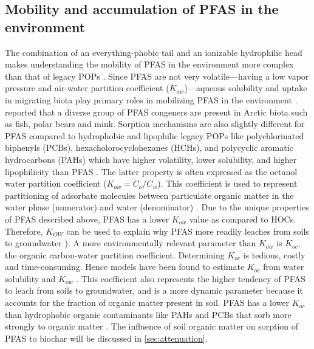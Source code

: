 \subsection{Mobility and accumulation of PFAS in the environment}
The combination of an everything-phobic tail and an ionizable hydrophilic head makes understanding the mobility of PFAS in the environment more complex than that of legacy POPs \citep{cabrerizo2018legacy,Arp2006}. Since PFAS are not very volatile---having a low vapor pressure and air-water partition coefficient ($K_{aw}$)---aqueous solubility and uptake in migrating biota play primary roles in mobilizing PFAS in the environment \citep{Arp2006}. \cite{Schlabach2017} reported that a diverse group of PFAS congeners are present in Arctic biota such as fish, polar bears and mink. Sorption mechanisms are also slightly different for PFAS compared to hydrophobic and lipophilic legacy POPs like polychlorinated biphenyls (PCBs), hexacholorocyclohexanes (HCHs), and polycyclic aromatic hydrocarbons (PAHs) which have higher volatility, lower solubility, and higher lipophilicity than PFAS \citep{cabrerizo2018legacy, Cornelissen2005,li2018}. The latter property is often expressed as the octanol water partition coefficient (\(K_{ow} = C_{o}/C_w\)). This coefficient is used to represent partitioning of adsorbate molecules between particulate organic matter in the water phase (numerator) and water (denominator) \citep{Reemtsma2016}. Due to the unique properties of PFAS described above, PFAS has a lower \(K_{ow}\) value as compared to HOCs. Therefore, \(K_{OW}\) can be used to explain why PFAS more readily leaches from soils to groundwater \citep{Cornelissen2005,du2014adsorption}). A more environmentally relevant parameter than \(K_{ow}\) is \(K_{oc}\), the organic carbon-water partition coefficient. Determining \(K_{oc}\) is tedious, costly and time-consuming. Hence models have been found to estimate \(K_{oc}\) from water solubility and \(K_{ow}\) \citep{pandey2021qspr}. This coefficient also represents the higher tendency of PFAS to leach from soils to groundwater, and is a more dynamic parameter because it accounts for the fraction of organic matter present in soil. PFAS has a lower \(K_{oc}\) than hydrophobic organic contaminants like PAHs and PCBs that sorb more strongly to organic matter \citep{Cornelissen2005}. The influence of soil organic matter on sorption of PFAS to biochar will be discussed in \cref{sec:attenuation}.  


